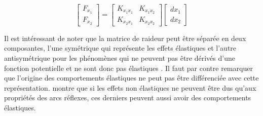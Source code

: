 \begin{equation} \label{mussa_ivaldi_force_displacement}
	\begin{bmatrix}
		F_{x_1} \\
		F_{x_2} 
	\end{bmatrix} = %
	\begin{bmatrix}
		K_{x_1x_1} & K_{x_1x_2} \\
		K_{x_2x_1} & K_{x_2x_2}
	\end{bmatrix} %
	\begin{bmatrix}
		dx_1 \\
		dx_2
	\end{bmatrix}
\end{equation}

Il est intéressant de noter que la matrice de raideur peut être séparée en deux composantes, l'une symétrique qui représente les effets élastiques et l'autre antisymétrique pour les phénomènes qui ne peuvent pas être dérivés d'une fonction potentielle et ne sont donc pas élastiques \parencite{hogan_mechanics_1985}. Il faut par contre remarquer que l'origine des comportements élastiques ne peut pas être différenciée avec cette représentation. \textcite{hogan_mechanics_1985} montre que si les effets non élastiques ne peuvent être dus qu'aux propriétés des arcs réflexes, ces derniers peuvent aussi avoir des comportements élastiques.

%	
%	

%

